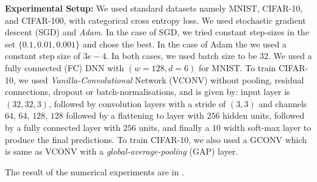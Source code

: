 \textbf{Experimental Setup:} We used standard datasets namely MNIST, CIFAR-10, and CIFAR-100, with categorical cross entropy loss. We used stochastic gradient descent (SGD) and \emph{Adam}. In the case of SGD, we tried constant step-sizes in the set $\{0.1,0.01,0.001\}$ and chose the best. In the case of Adam the we used a constant step size of $3e-4$. In both cases, we used batch size to be $32$. We used a fully connected (FC) DNN with $(w=128,d=6)$ for MNIST.%
To train CIFAR-10, we used \emph{Vanilla-Convolutional} Network (VCONV) without pooling, residual connections, dropout or batch-normalisations, and is given by: input layer is $(32, 32, 3)$, followed by convolution layers with a stride of $(3, 3)$ and channels $64$, $64$, $128$, $128$ followed by a flattening to layer with $256$ hidden units, followed by a fully connected layer with $256$ units, and finally a  $10$ width soft-max layer to produce the final predictions. To train CIFAR-10, we also used a GCONV which is same as VCONV with a \emph{global-average-pooling} (GAP) layer.

 
 
 The result of the numerical experiments are in . 
 \begin{table}[h]
\caption{Shows the training and generalisation performance of various NPFs.}
\label{tb:npfs}
\end{table}

